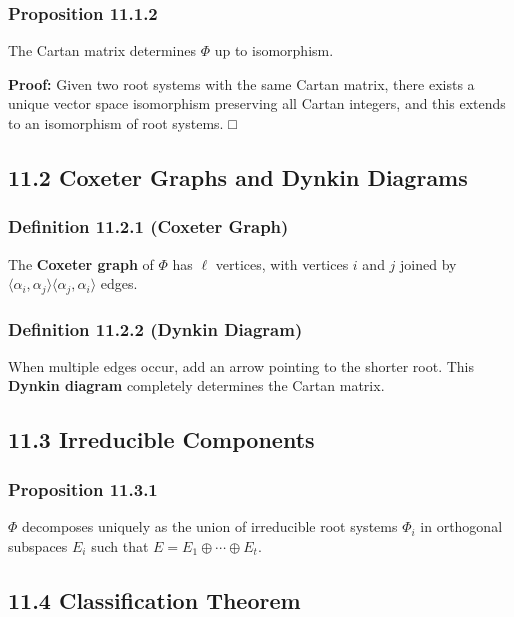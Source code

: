 \subsubsection{Proposition 11.1.2}

The Cartan matrix determines $\Phi$ up to isomorphism.

\textbf{Proof:}
Given two root systems with the same Cartan matrix, there exists a unique vector space isomorphism preserving all Cartan integers, and this extends to an isomorphism of root systems. □

\subsection{11.2 Coxeter Graphs and Dynkin Diagrams}

\subsubsection{Definition 11.2.1 (Coxeter Graph)}

The \textbf{Coxeter graph} of $\Phi$ has $\ell$ vertices, with vertices $i$ and $j$ joined by $\langle\alpha_i, \alpha_j\rangle\langle\alpha_j, \alpha_i\rangle$ edges.

\subsubsection{Definition 11.2.2 (Dynkin Diagram)}

When multiple edges occur, add an arrow pointing to the shorter root. This \textbf{Dynkin diagram} completely determines the Cartan matrix.

\subsection{11.3 Irreducible Components}

\subsubsection{Proposition 11.3.1}

$\Phi$ decomposes uniquely as the union of irreducible root systems $\Phi_i$ in orthogonal subspaces $E_i$ such that $E = E_1 \oplus \cdots \oplus E_t$.

\subsection{11.4 Classification Theorem}

